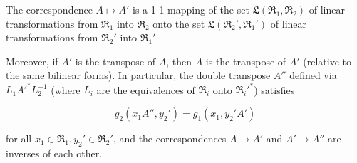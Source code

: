 The correspondence $A \mapsto A'$ is a 1-1 mapping of the set $\mathfrak{L}(\mathfrak{R}_1, \mathfrak{R}_2)$ of linear transformations from $\mathfrak{R}_1$ into $\mathfrak{R}_2$ onto the set $\mathfrak{L}(\mathfrak{R}_2', \mathfrak{R}_1')$ of linear transformations from $\mathfrak{R}_2'$ into $\mathfrak{R}_1'$.

Moreover, if $A'$ is the transpose of $A$, then $A$ is the transpose of $A'$ (relative to the same bilinear forms). In particular, the double transpose $A''$ defined via $L_1 A'^* L_2^{-1}$ (where $L_i$ are the equivalences of $\mathfrak{R}_i$ onto $\mathfrak{R}_i'^*$) satisfies

$$g_2(x_1 A'', y_2') = g_1(x_1, y_2' A')$$

for all $x_1 \in \mathfrak{R}_1, y_2' \in \mathfrak{R}_2'$, and the correspondences $A \to A'$ and $A' \to A''$ are inverses of each other.
